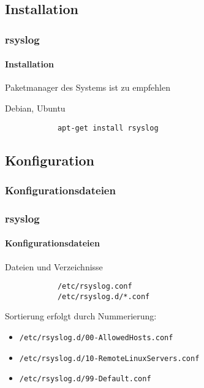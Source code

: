 \subsection{Installation}
\begin{frame}[fragile]
	\frametitle{rsyslog}
	\framesubtitle{Installation}
	Paketmanager des Systems ist zu empfehlen
	\bigskip
	\begin{block}{Debian, Ubuntu}
		\begin{verbatim}
			apt-get install rsyslog
		\end{verbatim}
	\end{block}
\end{frame}

\subsection{Konfiguration}
\subsubsection{Konfigurationsdateien}
\begin{frame}[fragile]
	\frametitle{rsyslog}
	\framesubtitle{Konfigurationsdateien}
	\begin{block}{Dateien und Verzeichnisse}
		\begin{verbatim}
			/etc/rsyslog.conf
			/etc/rsyslog.d/*.conf
		\end{verbatim}
	\end{block}
	Sortierung erfolgt durch Nummerierung:
	\begin{itemize}
		\item \verb|/etc/rsyslog.d/00-AllowedHosts.conf|
		\item \verb|/etc/rsyslog.d/10-RemoteLinuxServers.conf|
		\item \verb|/etc/rsyslog.d/99-Default.conf|
	\end{itemize}
\end{frame}

